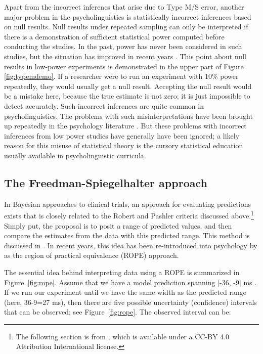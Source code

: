 \documentclass{cambridge7A}\usepackage[]{graphicx}\usepackage[]{color}
\begin{document}
Apart from the incorrect inferencs that  arise due to Type M/S error,  
another major problem in the psycholinguistics is statistically incorrect inferences based on null results.  Null results under repeated sampling can only be interpreted if there is a demonstration of sufficient statistical power \citep{hoenigheisey} computed before conducting the studies. In the past,  power has never been considered in such studies, but the situation has improved in recent years \citep[e.g.,][]{stack2018failure}.  This point about null results in low-power experiments is demonstrated in the upper part of Figure \ref{fig:typemdemo}. If a researcher were to run an experiment with 10\% power repeatedly, they would usually get a null result. Accepting the null result would be a mistake here, because the true estimate is not zero; it is just impossible to detect accurately. Such incorrect inferences are quite common in psycholinguistics. The problems with such misinterpretations  have been brought up repeatedly in the psychology literature 
\citep[e.g.,][]{cohen1962statistical}. But these problems with incorrect inferences from low power studies have generally have been ignored; a likely reason for this misuse of statistical theory is the cursory statistical education usually available in psycholinguistic curricula.

\subsection{The Freedman-Spiegelhalter approach}

 
In Bayesian approaches to clinical trials, an approach for evaluating predictions exists that is closely related to the Robert and Pashler criteria discussed above.\footnote{The following section is from \cite{VasishthGelman2019}, which is available under a CC-BY 4.0 Attribution International license.}
Simply put, the proposal is to posit a range of predicted values, and then compare the estimates from the data with this predicted range.   This method is discussed in \citep{Freedman1984,spiegelhalter1994bayesian}. In recent years, this idea has been re-introduced into psychology by \cite{kruschke2014doing} as the region of practical equivalence (ROPE) approach.  

The essential idea behind interpreting data using a ROPE is summarized in Figure~\ref{fig:rope}. Assume that we have a model prediction spanning [-36, -9] ms \citep{JaegerMertzenVanDykeVasishth2019}. If we run our experiment until we have the same width as the predicted range (here, 36-9=27 ms), then there are five possible uncertainty (confidence) intervals that can be observed; see  Figure~\ref{fig:rope}. The observed interval can be: 
\end{document}
